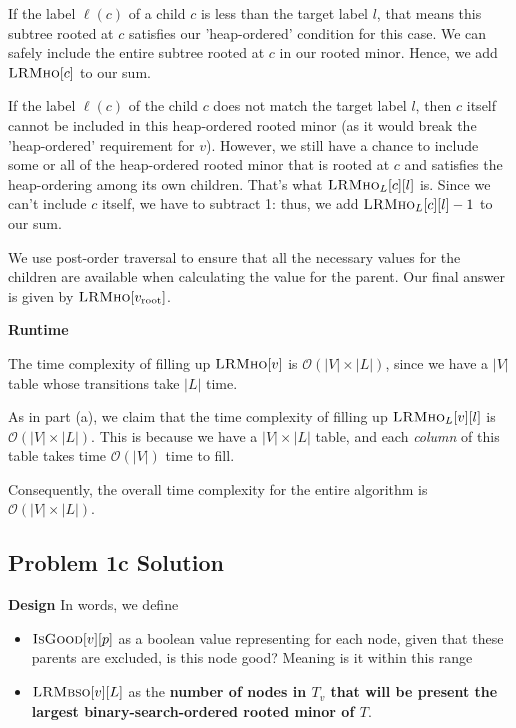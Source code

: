 \documentclass{article}
\begin{document}
        \begin{Cases}
            \item If the label \( \ell(c) \) of a child \( c \) is less than the target label \( l \), that means this subtree rooted at \( c \) satisfies our 'heap-ordered' condition for this case. We can safely include the entire subtree rooted at \( c \) in our rooted minor. Hence, we add \(\textsc{LRMho}[c]\) to our sum.
            \item If the label \( \ell(c) \) of the child \( c \) does not match the target label \( l \), then \( c \) itself cannot be included in this heap-ordered rooted minor (as it would break the 'heap-ordered' requirement for \( v \)). However, we still have a chance to include some or all of the heap-ordered rooted minor that is rooted at \( c \) and satisfies the heap-ordering among its own children. That's what \(\textsc{LRMho}_{L}[c][l]\) is. Since we can't include \( c \) itself, we have to subtract 1: thus, we add \( \textsc{LRMho}_{L}[c][l] - 1 \) to our sum.
        \end{Cases}
         We use post-order traversal to ensure that all the necessary values for the children are available when calculating the value for the parent. Our final answer is given by $\textsc{LRMho}[v_{\text{root}}]$.

    \vspace{2mm}
    \textbf{Runtime}
    
    The time complexity of filling up $\textsc{LRMho}[v]$ is $\mathcal{O}(|V|\times |L|)$, since we have a $|V|$ table whose transitions take $|L|$ time.

    \vspace{2mm}
    As in part (a), we claim that the time complexity of filling up \( \textsc{LRMho}_{L}[v][l] \) is \( \mathcal{O}(|V| \times |L|) \). This is because we have a $|V| \times |L|$ table, and each \textit{column} of this table takes time \( \mathcal{O}(|V|)\) time to fill.

    \vspace{2mm}
    Consequently, the overall time complexity for the entire algorithm is \( \mathcal{O}(|V| \times |L|) \).

\pagebreak
\subsection*{Problem 1c Solution}
    \textbf{Design}
        In words, we define
        \begin{itemize}
            \item $\textsc{IsGood}[v][p]$ as a boolean value representing for each node, given that these parents are excluded, is this node good? Meaning is it within this range
            \item $\textsc{LRMbso}[v][L]$ as the \textbf{number of nodes in $T_{v}$ that will be present the largest binary-search-ordered rooted minor of $T$}.
        \end{itemize}
\end{document}
